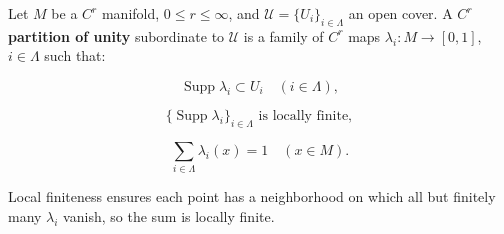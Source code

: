 Let $M$ be a $C^r$ manifold, $0 \leqslant r \leqslant \infty$, and $\mathcal{U} = \{U_i\}_{i \in \Lambda}$ an open cover. A $C^r$ \textbf{partition of unity} subordinate to $\mathcal{U}$ is a family of $C^r$ maps $\lambda_i: M \to [0,1]$, $i \in \Lambda$ such that:

$$\operatorname{Supp} \lambda_i \subset U_i \quad (i \in \Lambda),$$

$$\{\operatorname{Supp} \lambda_i\}_{i \in \Lambda} \text{ is locally finite},$$

$$\sum_{i \in \Lambda} \lambda_i(x) = 1 \quad (x \in M).$$

Local finiteness ensures each point has a neighborhood on which all but finitely many $\lambda_i$ vanish, so the sum is locally finite.
